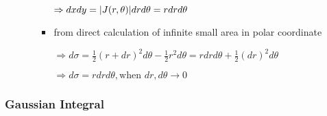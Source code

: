 \begin{itemize}
\begin{itemize}
\begin{itemize}
		$\Rightarrow dxdy = \lvert J(r,\theta)\rvert drd\theta = rdrd\theta$
			
		\item from direct calculation of infinite small area in polar coordinate 
		
		$\Rightarrow d\sigma = \frac 12 (r+dr)^2d\theta - \frac 12 r^2d\theta = rdrd\theta +\frac 12 (dr)^2d\theta$
			
		$\Rightarrow d\sigma = rdrd\theta, \text{when } dr,d\theta \rightarrow 0$
		\end{itemize}
	\end{itemize}
\end{itemize}

\subsubsection{Gaussian Integral}
